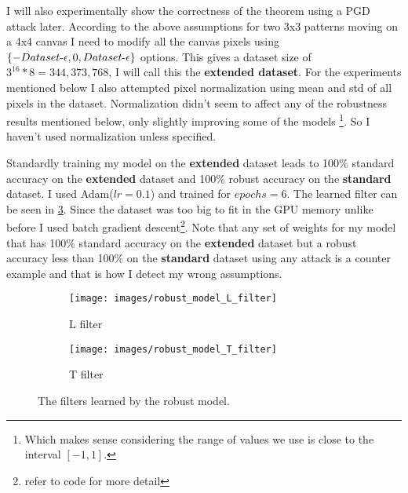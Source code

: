 \documentclass[../thesis.tex]{subfiles}
\begin{document}
	
	I will also experimentally show the correctness of the theorem using a PGD attack later. According to the above assumptions for two 3x3 patterns moving on a 4x4 canvas I need to modify all the canvas pixels using $\{-Dataset\text{-}\epsilon, 0, Dataset\text{-}\epsilon\}$ options. This gives a dataset size of $3^{16}*8 = 344,373,768$, I will call this the \textbf{extended dataset}. For the experiments mentioned below I also attempted pixel normalization using mean and std of all pixels in the dataset. Normalization didn't seem to affect any of the robustness results mentioned below, only slightly improving some of the models \footnote{Which makes sense considering the range of values we use is close to the interval $[-1,1]$.}. So I haven't used normalization unless specified.
	
	Standardly training my model on the \textbf{extended} dataset leads to 100\% standard accuracy on the \textbf{extended} dataset and 100\% robust accuracy on the \textbf{standard} dataset. I used Adam($lr=0.1$) and trained for $epochs = 6$. The learned filter can be seen in \ref{fig:robust_model_filters}. Since the dataset was too big to fit in the GPU memory unlike before I used batch gradient descent\footnote{refer to code for more detail}. Note that any set of weights for my model that has 100\% standard accuracy on the \textbf{extended} dataset but a robust accuracy less than 100\% on the \textbf{standard} dataset using any attack is a counter example and that is how I detect my wrong assumptions.
	
	\begin{figure}
		\centering
		\begin{subfigure}{.5\textwidth}
			\centering
			\texttt{[image: images/robust\_model\_L\_filter]}
			\caption{L filter}
			\label{fig:robustmodelLfilter}
		\end{subfigure}%
		\begin{subfigure}{.5\textwidth}
			\centering
			\texttt{[image: images/robust\_model\_T\_filter]}
			\caption{T filter}
			\label{fig:robustmodelTfilter}
		\end{subfigure}
		\caption{The filters learned by the robust model.}
		\label{fig:robust_model_filters}
	\end{figure}
	
\end{document}
